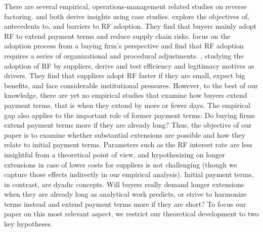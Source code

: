 \documentclass[A4,11pt]{article}
\renewcommand{\~}[1]{\tilde{#1}}
\renewcommand{\-}[1]{\overline{#1}}
\begin{document}
There are several empirical, operations-management related studies on reverse factoring. \citet{Liebl2016} and \citet{Wuttke2013} both derive insights using case studies. \citet{Liebl2016} explore the objectives of, antecedents to, and barriers to RF adoption. They find that buyers mainly adopt RF to extend payment terms and reduce supply chain risks. \citet{Wuttke2013} focus on the adoption process from a buying firm's perspective and find that RF adoption requires a series of organizational and procedural adjustments. \citet{Wuttke2019}, studying the adoption of RF by suppliers, derive and test efficiency and legitimacy motives as drivers. They find that suppliers adopt RF faster if they are small, expect big benefits, and face considerable institutional pressures. However, to the best of our knowledge, there are yet no empirical studies that examine how buyers extend payment terms, that is when they extend by more or fewer days. The empirical gap also applies to the important role of former payment terms: Do buying firms extend payment terms more if they are already long? Thus, the objective of our paper is to examine whether substantial extensions are possible and how they relate to initial payment terms. Parameters such as the RF interest rate are less insightful from a theoretical point of view, and hypothesizing on longer extensions in case of lower costs for suppliers is not challenging (though we capture those effects indirectly in our empirical analysis). Initial payment terms, in contrast, are dyadic concepts. Will buyers really demand longer extensions when they are already long as analytical work predicts, or strive to harmonize terms instead and extend payment terms more if they are short? To focus our paper on this most relevant aspect, we restrict our theoretical development to two key hypotheses.
\end{document}
